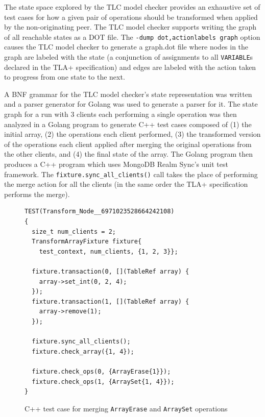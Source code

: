 \documentclass{vldb}
\begin{document}
The state space explored by the TLC model checker provides an exhaustive set of test cases for how a given pair of operations should be transformed when applied by the non-originating peer. The TLC model checker supports writing the graph of all reachable states as a DOT file. The \texttt{-dump dot,actionlabels graph} option causes the TLC model checker to generate a graph.dot file where nodes in the graph are labeled with the state (a conjunction of assignments to all \texttt{VARIABLE}s declared in the TLA+ specification) and edges are labeled with the action taken to progress from one state to the next.

A BNF grammar for the TLC model checker's state representation was written and a parser generator for Golang was used \cite{GoccGitHub} to generate a parser for it. The state graph for a run with 3 clients each performing a single operation was then analyzed in a Golang program to generate C++ test cases composed of (1) the initial array, (2) the operations each client performed, (3) the transformed version of the operations each client applied after merging the original operations from the other clients, and (4) the final state of the array. The Golang program then produces a C++ program which uses MongoDB Realm Sync's unit test framework. The \texttt{fixture.sync\_all\_clients()} call takes the place of performing the merge action for all the clients (in the same order the TLA+ specification performs the merge).

\begin{figure}
\begin{verbatim}
TEST(Transform_Node__6971023528664242108)
{
  size_t num_clients = 2;
  TransformArrayFixture fixture{
    test_context, num_clients, {1, 2, 3}};

  fixture.transaction(0, [](TableRef array) {
    array->set_int(0, 2, 4);
  });
  fixture.transaction(1, [](TableRef array) {
    array->remove(1);
  });

  fixture.sync_all_clients();
  fixture.check_array({1, 4});

  fixture.check_ops(0, {ArrayErase{1}});
  fixture.check_ops(1, {ArraySet{1, 4}});
}
\end{verbatim}
\caption{C++ test case for merging \texttt{ArrayErase} and \texttt{ArraySet} operations}
\label{fig:cpp_test_erase_set_merge}
\end{figure}
\end{document}
